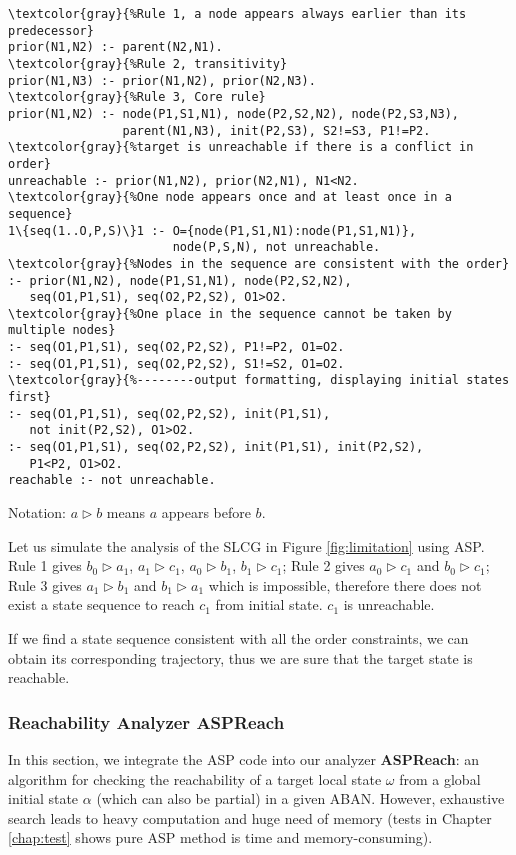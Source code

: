 \begin{Verbatim}[commandchars=\\\{\}]
\textcolor{gray}{%Rule 1, a node appears always earlier than its predecessor}
prior(N1,N2) :- parent(N2,N1).
\textcolor{gray}{%Rule 2, transitivity}
prior(N1,N3) :- prior(N1,N2), prior(N2,N3).
\textcolor{gray}{%Rule 3, Core rule}
prior(N1,N2) :- node(P1,S1,N1), node(P2,S2,N2), node(P2,S3,N3), 
                parent(N1,N3), init(P2,S3), S2!=S3, P1!=P2. 
\textcolor{gray}{%target is unreachable if there is a conflict in order}
unreachable :- prior(N1,N2), prior(N2,N1), N1<N2.
\textcolor{gray}{%One node appears once and at least once in a sequence}
1\{seq(1..O,P,S)\}1 :- O={node(P1,S1,N1):node(P1,S1,N1)},
                       node(P,S,N), not unreachable.
\textcolor{gray}{%Nodes in the sequence are consistent with the order}
:- prior(N1,N2), node(P1,S1,N1), node(P2,S2,N2),
   seq(O1,P1,S1), seq(O2,P2,S2), O1>O2.
\textcolor{gray}{%One place in the sequence cannot be taken by multiple nodes}
:- seq(O1,P1,S1), seq(O2,P2,S2), P1!=P2, O1=O2.
:- seq(O1,P1,S1), seq(O2,P2,S2), S1!=S2, O1=O2.
\textcolor{gray}{%--------output formatting, displaying initial states first}
:- seq(O1,P1,S1), seq(O2,P2,S2), init(P1,S1),
   not init(P2,S2), O1>O2.
:- seq(O1,P1,S1), seq(O2,P2,S2), init(P1,S1), init(P2,S2),
   P1<P2, O1>O2.
reachable :- not unreachable.
\end{Verbatim}

Notation: $a\rhd b$ means $a$ appears before $b$.

\begin{example}
Let us simulate the analysis of the SLCG in Figure \ref{fig:limitation} using ASP.
Rule 1 gives $b_0\rhd a_1$, $a_1\rhd c_1$, $a_0\rhd b_1$, $b_1\rhd c_1$; Rule 2 gives $a_0\rhd c_1$ and $b_0\rhd c_1$; Rule 3 gives $a_1\rhd b_1$ and $b_1\rhd a_1$ which is impossible, therefore there does not exist a state sequence to reach $c_1$ from initial state.
$c_1$ is unreachable.
\end{example}


If we find a state sequence consistent with all the order constraints, we can obtain its corresponding trajectory, thus we are sure that the target state is reachable.
\subsubsection{Reachability Analyzer ASPReach}
In this section, we integrate the ASP code into our analyzer \textbf{ASPReach}: an algorithm for checking the reachability of a target local state $\omega$ from a global initial state $\alpha$ (which can also be partial) in a given ABAN.
However, exhaustive search leads to heavy computation and huge need of memory (tests in Chapter \ref{chap:test} shows pure ASP method is time and memory-consuming).


